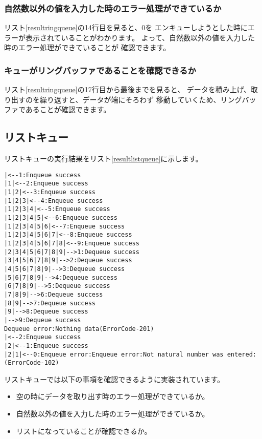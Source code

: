 \documentclass[a4j]{jarticle}
\begin{document}
\subsubsection{自然数以外の値を入力した時のエラー処理ができているか}
リスト\ref{resultringqueue}の14行目を見ると、0を
エンキューしようとした時にエラーが表示されていることがわかります。
よって、自然数以外の値を入力した時のエラー処理ができていることが
確認できます。

\subsubsection{キューがリングバッファであることを確認できるか}
リスト\ref{resultringqueue}の17行目から最後までを見ると、
データを積み上げ、取り出すのを繰り返すと、データが端にそろわず
移動していくため、リングバッファであることが確認できます。

\subsection{リストキュー}
リストキューの実行結果をリスト\ref{resultlistqueue}に示します。

\begin{lstlisting}[caption=リストキューの実行結果,label=resultlistqueue]
|<--1:Enqueue success
|1|<--2:Enqueue success
|1|2|<--3:Enqueue success
|1|2|3|<--4:Enqueue success
|1|2|3|4|<--5:Enqueue success
|1|2|3|4|5|<--6:Enqueue success
|1|2|3|4|5|6|<--7:Enqueue success
|1|2|3|4|5|6|7|<--8:Enqueue success
|1|2|3|4|5|6|7|8|<--9:Enqueue success
|2|3|4|5|6|7|8|9|-->1:Dequeue success
|3|4|5|6|7|8|9|-->2:Dequeue success
|4|5|6|7|8|9|-->3:Dequeue success
|5|6|7|8|9|-->4:Dequeue success
|6|7|8|9|-->5:Dequeue success
|7|8|9|-->6:Dequeue success
|8|9|-->7:Dequeue success
|9|-->8:Dequeue success
|-->9:Dequeue success
Dequeue error:Nothing data(ErrorCode-201)
|<--2:Enqueue success
|2|<--1:Enqueue success
|2|1|<--0:Enqueue error:Enqueue error:Not natural number was entered:(ErrorCode-102)
\end{lstlisting}

リストキューでは以下の事項を確認できるように実装されています。
\begin{itemize}
  \item 空の時にデータを取り出す時のエラー処理ができているか。
  \item 自然数以外の値を入力した時のエラー処理ができているか。
  \item リストになっていることが確認できるか。
\end{itemize}
\end{document}
